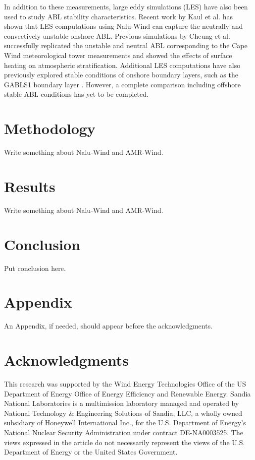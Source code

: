 \documentclass[conf]{new-aiaa}
\begin{document}
In addition to these measurements, large eddy simulations (LES) have
also been used to study ABL stability characteristics.  Recent work by
Kaul et al. \cite{kaul2020large} has shown that LES computations using
Nalu-Wind can capture the neutrally and convectively unstable onshore
ABL.  Previous simulations by Cheung et al. \cite{cheung2020large}
successfully replicated the unstable and neutral ABL corresponding to
the Cape Wind meteorological tower measurements
\cite{archer2016predominance} and showed the effects of surface
heating on atmospheric stratification.  Additional LES computations
\cite{sullivan2016turbulent} have also previously explored stable
conditions of onshore boundary layers, such as the GABLS1 boundary
layer \cite{beare2006intercomparison}.  However, a complete comparison
including offshore stable ABL conditions has yet to be completed.


\section{Methodology}
Write something about Nalu-Wind and AMR-Wind.

\section{Results}
Write something about Nalu-Wind and AMR-Wind.

\section{Conclusion}
Put conclusion here.

\section*{Appendix}

An Appendix, if needed, should appear before the acknowledgments.

\section*{Acknowledgments}
This research was supported by the Wind Energy Technologies Office of
the US Department of Energy Office of Energy Efficiency and Renewable
Energy.  Sandia National Laboratories is a multimission laboratory
managed and operated by National Technology \& Engineering Solutions
of Sandia, LLC, a wholly owned subsidiary of Honeywell International
Inc., for the U.S. Department of Energy's National Nuclear Security
Administration under contract DE-NA0003525. The views expressed in the
article do not necessarily represent the views of the U.S. Department
of Energy or the United States Government.

% 

\end{document}
